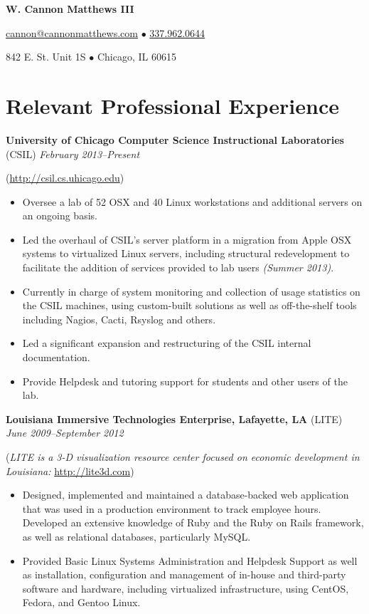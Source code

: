 \documentclass[10pt,letterpaper]{article} %
\begin{document}
 
    \centerline{\LARGE \bf W. Cannon Matthews III} 
    \centerline{ \href{mailto:cannon@cannonmatthews.com}{cannon@cannonmatthews.com} $\bullet$ \href{tel:13379620644}{337.962.0644 }}
    \centerline{842 E.  St. Unit 1S $\bullet$ Chicago, IL 60615 }
    \hrulefill
%
    \section*{Relevant Professional Experience} 
        \textbf{University of Chicago Computer Science Instructional Laboratories} (CSIL) \hfill \textit{February 2013--Present }
            \begin{footnotesize}
                (\url{http://csil.cs.uhicago.edu})
            \end{footnotesize}
            \begin{itemize}
            \item Oversee a lab of 52 OSX and 40 Linux workstations and additional servers on an ongoing basis.
            \item Led the overhaul of CSIL's server platform in a migration from Apple OSX systems to virtualized Linux servers, including structural redevelopment to facilitate the addition of services provided to lab users \textit{(Summer 2013)}. 
            \item Currently in charge of system monitoring and collection of usage statistics on the CSIL machines, using custom-built solutions as well as off-the-shelf tools including Nagios, Cacti, Rsyslog and others. 
	    \item Led a significant expansion and restructuring of the CSIL internal documentation.
            \item Provide Helpdesk and tutoring support for students and other users of the lab. 
            \end{itemize}
            \vspace{1em}
        \textbf{Louisiana Immersive Technologies Enterprise, Lafayette, LA} (LITE) \hfill \textit{June 2009--September 2012} 

            \begin{footnotesize}
                (\textit{LITE is a 3-D visualization resource center focused on economic development in Louisiana: }\url{http://lite3d.com})
            \end{footnotesize}
            \begin{itemize} 
            \item  Designed, implemented and maintained a database-backed web application that was used in a production environment to track 
                   employee hours. Developed an extensive knowledge of Ruby and the 
                   Ruby on Rails framework, as well as relational databases, particularly MySQL.
            \item  Provided Basic Linux Systems Administration and Helpdesk Support as well as installation, configuration and 
                   management of in-house and third-party software and hardware, including virtualized infrastructure, using CentOS, Fedora, and Gentoo Linux.
            \end{itemize} 
\end{document}
